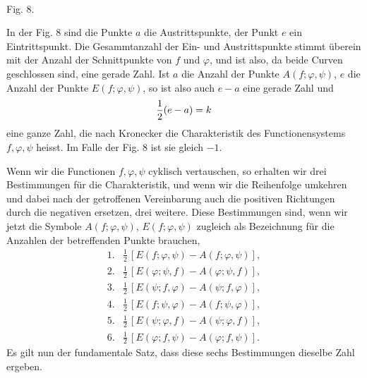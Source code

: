 \documentclass[11pt]{article}
\begin{document}
\begin{center}
\\[-0.2em]
{\small Fig. 8.}
\end{center}


In der Fig. 8 sind die Punkte $a$ die Austrittspunkte, der Punkt $e$ ein Eintrittspunkt. Die Gesammtanzahl der Ein- und Austrittspunkte stimmt überein mit der Anzahl der Schnittpunkte von $f$ und $\varphi$, und ist also, da beide Curven geschlossen sind, eine gerade Zahl. Ist $a$ die Anzahl der Punkte $A(f;\varphi,\psi)$, $e$ die Anzahl der Punkte $E(f;\varphi,\psi)$, so ist also auch $e-a$ eine gerade Zahl und
\[
        {1\over2}(e-a)=k
\]
eine ganze Zahl, die nach Kronecker die Charakteristik des Functionensystems $f,\varphi,\psi$ heisst. Im Falle der Fig. 8 ist sie gleich $-1$.

Wenn wir die Functionen $f,\varphi,\psi$ cyklisch vertauschen, so erhalten wir drei Bestimmungen für die Charakteristik, und wenn wir die Reihenfolge umkehren und dabei nach der getroffenen Vereinbarung auch die positiven Richtungen durch die negativen ersetzen, drei weitere. Diese Bestimmungen sind, wenn wir jetzt die Symbole $A(f;\varphi,\psi)$, $E(f;\varphi,\psi)$ zugleich als Bezeichnung für die Anzahlen der betreffenden Punkte brauchen,
\[
\begin{array}{ll}
1.&\frac12\,[E(f;\varphi,\psi)-A(f;\varphi,\psi)],\\
2.&\frac12\,[E(\varphi;\psi,f)-A(\varphi;\psi,f)],\\
3.&\frac12\,[E(\psi;f,\varphi)-A(\psi;f,\varphi)],\\
4.&\frac12\,[E(f;\psi,\varphi)-A(f;\psi,\varphi)],\\
5.&\frac12\,[E(\psi;\varphi,f)-A(\psi;\varphi,f)],\\
6.&\frac12\,[E(\varphi;f,\psi)-A(\varphi;f,\psi)].
\end{array}
\]
Es gilt nun der fundamentale Satz, dass diese sechs Bestimmungen dieselbe Zahl ergeben.
\end{document}
